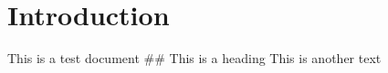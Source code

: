 \hypertarget{introduction}{%
\section{Introduction}\label{introduction}}

This is a test document \#\# This is a heading This is another text

